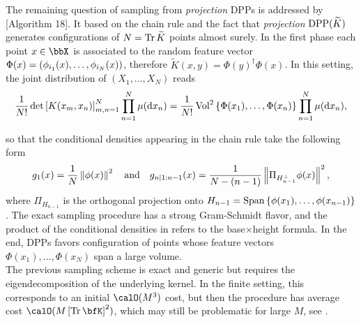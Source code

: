 \documentclass[twoside,11pt]{article}
\begin{document}
      The remaining question of sampling from \textit{projection} DPPs is addressed by \citet{HKPV06}[Algorithm 18].
      It based on the chain rule and the fact that \textit{projection} $\operatorname{DPP}(\widetilde{K})$ generates configurations of $N=\operatorname{Tr} \widetilde{K}$ points almost surely.
      In the first phase each point $x\in \bbX$ is associated to the random feature vector $\Phi(x)=\left( \phi_{i_1}(x),\dots,\phi_{i_N}(x) \right)$, therefore $\tilde{K}(x,y) = \Phi(y)^{\dagger} \Phi(x)$.
      In this setting, the joint distribution of $(X_1,\dots,X_N)$ reads
      \begin{equation}
      \label{eq:joint_distribution}
        \frac{1}{N!} \det \left[ K(x_m,x_n) \right]_{m,n=1}^N \prod_{n=1}^N\mu(\mathop{}\!\mathrm{d} x_n)
          = \frac{1}{N!} \operatorname{Vol}^2\left\{ \Phi(x_1),\dots,\Phi(x_n) \right\} \prod_{n=1}^N\mu(\mathop{}\!\mathrm{d} x_n),
      \end{equation}

      so that the conditional densities appearing in the chain rule take the following form
      \begin{equation}
      \label{eq:conditionals_densities}
        g_1(x)
          = \frac{1}{N} \left\| \phi(x) \right\|^2
          \quad\text{and}\quad
        g_{n | 1:n-1}(x)
          = \frac{1}{N-(n-1)} \left\|  \Pi_{H_{n-1}^{\perp}} \phi(x) \right\|^2,
      \end{equation}
      where $\Pi_{H_{n-1}}$ is the orthogonal projection onto
      $H_{n-1} = \operatorname{Span}\left\{ \phi(x_1), \dots, \phi(x_{n-1})  \right\}$.
      The exact sampling procedure has a strong Gram-Schmidt flavor, and the product of the conditional densities in  refers to the base$\times$height formula.
      In the end, DPPs favors configuration of points whose feature vectors $\Phi(x_1),\dots, \Phi(x_N)$ span a large volume.\\

      The previous sampling scheme is exact and generic but requires the eigendecomposition of the underlying kernel.
      In the finite setting, this corresponds to an initial $\calO(M^3)$ cost, but then the procedure has average cost $\calO(M\lrb{\Tr \bfK}^2)$, which may still be problematic for large $M$, see \citep{TrBaAm18}.
\end{document}
